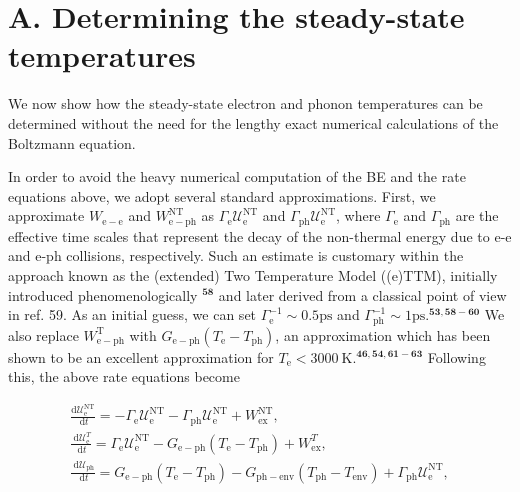 \documentclass[10pt]{article}
\begin{document}
\section*{A. Determining the steady-state temperatures}
We now show how the steady-state electron and phonon temperatures can be determined without the need for the lengthy exact numerical calculations of the Boltzmann equation.

In order to avoid the heavy numerical computation of the BE and the rate equations above, we adopt several standard approximations. First, we approximate $W_{\mathrm{e}-\mathrm{e}}$ and $W_{\mathrm{e}-\mathrm{ph}}^{\mathrm{NT}}$ as $\Gamma_{\mathrm{e}} \mathcal{U}_{\mathrm{e}}^{\mathrm{NT}}$ and $\Gamma_{\mathrm{ph}} \mathcal{U}_{\mathrm{e}}^{\mathrm{NT}}$, where $\Gamma_{\mathrm{e}}$ and $\Gamma_{\mathrm{ph}}$ are the effective time scales that represent the decay of the non-thermal energy due to e-e and e-ph collisions, respectively. Such an estimate is customary within the approach known as the (extended) Two Temperature Model ((e)TTM), initially introduced phenomenologically ${ }^{\mathbf{5 8}}$ and later derived from a classical point of view in ref. 59. As an initial guess, we can set $\Gamma_{\mathrm{e}}^{-1} \sim 0.5 \mathrm{ps}$ and $\Gamma_{\mathrm{ph}}^{-1} \sim 1 \mathrm{ps} .^{\mathbf{5 3 , 5 8 - 6 0}}$ We also replace $W_{\mathrm{e}-\mathrm{ph}}^{\mathrm{T}}$ with $G_{\mathrm{e}-\mathrm{ph}}\left(T_{\mathrm{e}}-T_{\mathrm{ph}}\right)$, an approximation which has been shown to be an excellent approximation for $T_{\mathrm{e}}<3000 \mathrm{~K} .^{\mathbf{4 6 , 5 4 , 6 1 - 6 3}}$ Following this, the above rate equations become

$$
\begin{gathered}
\frac{\mathrm{d} \mathcal{U}_{\mathrm{e}}^{\mathrm{NT}}}{\mathrm{~d} t}=-\Gamma_{\mathrm{e}} \mathcal{U}_{\mathrm{e}}^{\mathrm{NT}}-\Gamma_{\mathrm{ph}} \mathcal{U}_{\mathrm{e}}^{\mathrm{NT}}+W_{\mathrm{ex}}^{\mathrm{NT}}, \\
\frac{\mathrm{~d} \mathcal{U}_{\mathrm{e}}^{T}}{\mathrm{~d} t}=\Gamma_{\mathrm{e}} \mathcal{U}_{\mathrm{e}}^{\mathrm{NT}}-G_{\mathrm{e}-\mathrm{ph}}\left(T_{\mathrm{e}}-T_{\mathrm{ph}}\right)+W_{\mathrm{ex}}^{T}, \\
\frac{\mathrm{~d} \mathcal{U}_{\mathrm{ph}}}{\mathrm{~d} t}=G_{\mathrm{e}-\mathrm{ph}}\left(T_{\mathrm{e}}-T_{\mathrm{ph}}\right)-G_{\mathrm{ph}-\mathrm{env}}\left(T_{\mathrm{ph}}-T_{\mathrm{env}}\right)+\Gamma_{\mathrm{ph}} \mathcal{U}_{\mathrm{e}}^{\mathrm{NT}},
\end{gathered}
$$
\end{document}
